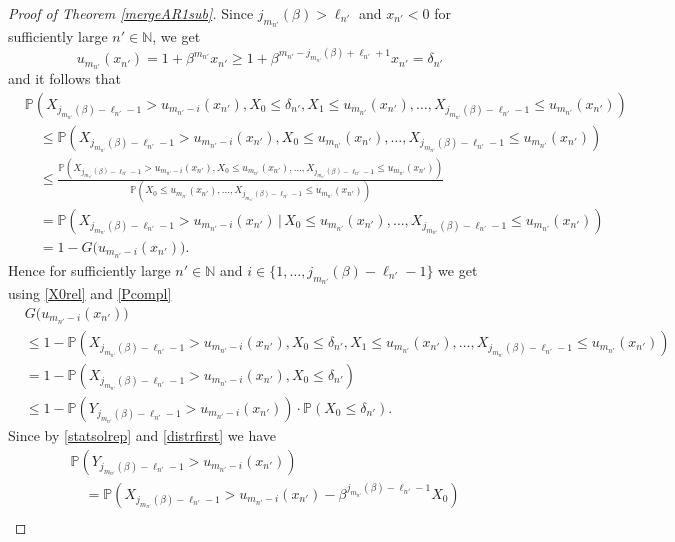 \documentclass[12pt]{amsart}
\theoremstyle{definition}
\theoremstyle{remark}
\newcommand{\nat}{{\mathbb N}}
\newcommand{\Pm}{{\mathbb P}}
\numberwithin{equation}{section}
\begin{document}
\begin{proof}[Proof of Theorem \ref{mergeAR1sub}]
Since $j_{m_{n'}}(\beta)>\ell_{n'}$ and $x_{n'}<0$ for sufficiently large $n'\in\nat$, we get 
$$u_{m_{n'}}(x_{n'})=1+\beta^{m_{n'}}x_{n'}\geq 1+\beta^{m_{n'}-j_{m_{n'}}(\beta)+\ell_{n'}+1}x_{n'}=\delta_{n'}$$
and it follows that
\begin{align*}
& \Pm\left(X_{j_{m_{n'}}(\beta)-\ell_{n'}-1}>u_{m_{n'}-i}(x_{n'}), X_{0}\leq\delta_{n'},X_{1}\leq u_{m_{n'}}(x_{n'}),\ldots,X_{j_{m_{n'}}(\beta)-\ell_{n'}-1}\leq u_{m_{n'}}(x_{n'})\right)\\
& \quad\leq\Pm\left(X_{j_{m_{n'}}(\beta)-\ell_{n'}-1}>u_{m_{n'}-i}(x_{n'}), X_{0}\leq u_{m_{n'}}(x_{n'}),\ldots,X_{j_{m_{n'}}(\beta)-\ell_{n'}-1}\leq u_{m_{n'}}(x_{n'})\right)\\
& \quad\leq\frac{\Pm\left(X_{j_{m_{n'}}(\beta)-\ell_{n'}-1}>u_{m_{n'}-i}(x_{n'}), X_{0}\leq u_{m_{n'}}(x_{n'}),\ldots,X_{j_{m_{n'}}(\beta)-\ell_{n'}-1}\leq u_{m_{n'}}(x_{n'})\right)}{\Pm\left(X_{0}\leq u_{m_{n'}}(x_{n'}),\ldots,X_{j_{m_{n'}}(\beta)-\ell_{n'}-1}\leq u_{m_{n'}}(x_{n'})\right)}\\
& \quad=\Pm\left(X_{j_{m_{n'}}(\beta)-\ell_{n'}-1}>u_{m_{n'}-i}(x_{n'})\,\Big|\,X_{0}\leq u_{m_{n'}}(x_{n'}),\ldots,X_{j_{m_{n'}}(\beta)-\ell_{n'}-1}\leq u_{m_{n'}}(x_{n'})\right)\\
& \quad=1-G\big(u_{m_{n'}-i}(x_{n'})\big).
\end{align*}
Hence for sufficiently large $n'\in\nat$ and $i\in\{1,\ldots,j_{m_{n'}}(\beta)-\ell_{n'}-1\}$ we get using \eqref{X0rel} and \eqref{Pcompl}
\begin{align*}
& G\big(u_{m_{n'}-i}(x_{n'})\big)\\
& \leq 1-\Pm\left(X_{j_{m_{n'}}(\beta)-\ell_{n'}-1}>u_{m_{n'}-i}(x_{n'}), X_{0}\leq\delta_{n'},X_{1}\leq u_{m_{n'}}(x_{n'}),\ldots,X_{j_{m_{n'}}(\beta)-\ell_{n'}-1}\leq u_{m_{n'}}(x_{n'})\right)\\
& =1-\Pm\left(X_{j_{m_{n'}}(\beta)-\ell_{n'}-1}>u_{m_{n'}-i}(x_{n'}), X_{0}\leq\delta_{n'}\right)\\
& \leq1-\Pm\left(Y_{j_{m_{n'}}(\beta)-\ell_{n'}-1}>u_{m_{n'}-i}(x_{n'})\right)\cdot\Pm\left(X_{0}\leq\delta_{n'}\right).
\end{align*}
Since by \eqref{statsolrep} and \eqref{distrfirst} we have
\begin{align*}
& \Pm\left(Y_{j_{m_{n'}}(\beta)-\ell_{n'}-1}>u_{m_{n'}-i}(x_{n'})\right)\\
& \quad=\Pm\left(X_{j_{m_{n'}}(\beta)-\ell_{n'}-1}>u_{m_{n'}-i}(x_{n'})-\beta^{j_{m_{n'}}(\beta)-\ell_{n'}-1}X_{0}\right)\\

\end{align*}
\end{proof}
\end{document}
